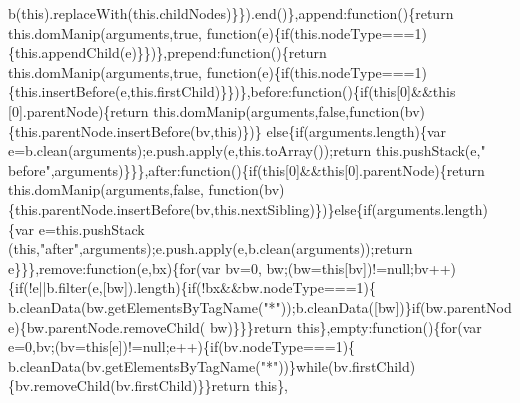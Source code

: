 \begin{DoxyCode}
      b(\textcolor{keyword}{this}).replaceWith(this.childNodes)\}\}).end()\},append:\textcolor{keyword}{function}()\{\textcolor{keywordflow}{return} this.domManip(arguments,\textcolor{keyword}{true},\textcolor{keyword}{
      function}(e)\{\textcolor{keywordflow}{if}(this.nodeType===1)\{this.appendChild(e)\}\})\},prepend:\textcolor{keyword}{function}()\{\textcolor{keywordflow}{return} this.domManip(arguments,\textcolor{keyword}{true},\textcolor{keyword}{
      function}(e)\{\textcolor{keywordflow}{if}(this.nodeType===1)\{this.insertBefore(e,this.firstChild)\}\})\},before:\textcolor{keyword}{function}()\{\textcolor{keywordflow}{if}(\textcolor{keyword}{this}[0]&&\textcolor{keyword}{this}
      [0].parentNode)\{\textcolor{keywordflow}{return} this.domManip(arguments,\textcolor{keyword}{false},\textcolor{keyword}{function}(bv)\{this.parentNode.insertBefore(bv,\textcolor{keyword}{this})\})\}\textcolor{keywordflow}{
      else}\{\textcolor{keywordflow}{if}(arguments.length)\{var e=b.clean(arguments);e.push.apply(e,this.toArray());\textcolor{keywordflow}{return} this.pushStack(e,\textcolor{stringliteral}{"
      before"},arguments)\}\}\},after:\textcolor{keyword}{function}()\{\textcolor{keywordflow}{if}(\textcolor{keyword}{this}[0]&&\textcolor{keyword}{this}[0].parentNode)\{\textcolor{keywordflow}{return} this.domManip(arguments,\textcolor{keyword}{false},\textcolor{keyword}{
      function}(bv)\{this.parentNode.insertBefore(bv,this.nextSibling)\})\}\textcolor{keywordflow}{else}\{\textcolor{keywordflow}{if}(arguments.length)\{var e=this.pushStack
      (\textcolor{keyword}{this},\textcolor{stringliteral}{"after"},arguments);e.push.apply(e,b.clean(arguments));\textcolor{keywordflow}{return} e\}\}\},\textcolor{keyword}{remove}:\textcolor{keyword}{function}(e,bx)\{\textcolor{keywordflow}{for}(var bv=0,
      bw;(bw=\textcolor{keyword}{this}[bv])!=null;bv++)\{\textcolor{keywordflow}{if}(!e||b.filter(e,[bw]).length)\{\textcolor{keywordflow}{if}(!bx&&bw.nodeType===1)\{
      b.cleanData(bw.getElementsByTagName(\textcolor{stringliteral}{"*"}));b.cleanData([bw])\}\textcolor{keywordflow}{if}(bw.parentNode)\{bw.parentNode.removeChild(
      bw)\}\}\}\textcolor{keywordflow}{return} \textcolor{keyword}{this}\},empty:\textcolor{keyword}{function}()\{\textcolor{keywordflow}{for}(var e=0,bv;(bv=\textcolor{keyword}{this}[e])!=null;e++)\{\textcolor{keywordflow}{if}(bv.nodeType===1)\{
      b.cleanData(bv.getElementsByTagName(\textcolor{stringliteral}{"*"}))\}\textcolor{keywordflow}{while}(bv.firstChild)\{bv.removeChild(bv.firstChild)\}\}\textcolor{keywordflow}{return} \textcolor{keyword}{this}\},

\end{DoxyCode}
